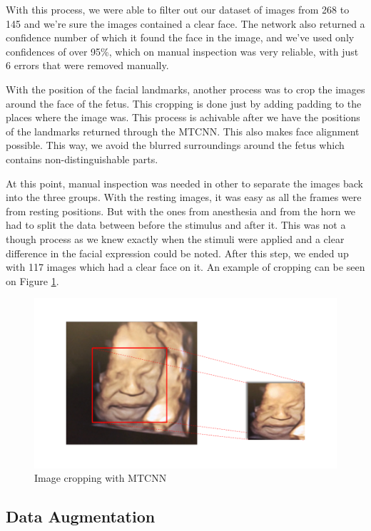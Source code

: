 With this process, we were able to filter out our dataset of images from 268 to 145 and we're sure the images contained a clear face. The network also returned a confidence number of which it found the face in the image, and we've used only confidences of over 95\%, which on manual inspection was very reliable, with just 6 errors that were removed manually.

With the position of the facial landmarks, another process was to crop the images around the face of the fetus. This cropping is done just by adding padding to the places where the image was. This process is achivable after we have the positions of the landmarks returned through the MTCNN. This also makes face alignment possible. This way, we avoid the blurred surroundings around the fetus which contains non-distinguishable parts. 

At this point, manual inspection was needed in other to separate the images back into the three groups. With the resting images, it was easy as all the frames were from resting positions. But with the ones from anesthesia and from the horn we had to split the data between before the stimulus and after it. This was not a though process as we knew exactly when the stimuli were applied and a clear difference in the facial expression could be noted. After this step, we ended up with 117 images which had a clear face on it. An example of cropping can be seen on Figure \ref{fig:cropping}.

\begin{figure}[h!tp]
    \centering
    \includegraphics[width=.9\textwidth]{imgs/chap3_cropping.png}
    \caption{Image cropping with MTCNN}
    \label{fig:cropping}
\end{figure}

\subsection{Data Augmentation}

